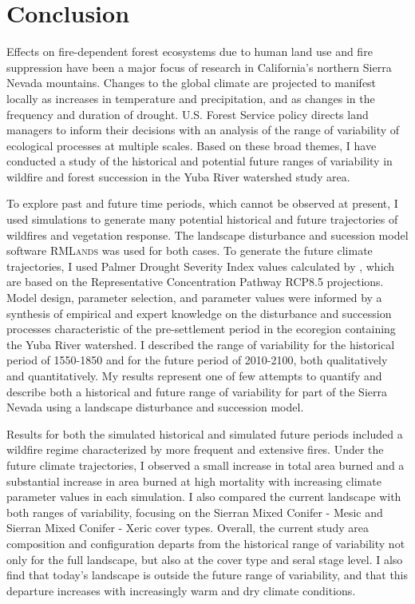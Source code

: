 
\chapter{Conclusion}

Effects on fire-dependent forest ecosystems due to human land use and fire suppression have been a major focus of research in California's northern Sierra Nevada mountains. Changes to the global climate are projected to manifest locally as increases in temperature and precipitation, and as changes in the frequency and duration of drought. U.S. Forest Service policy directs land managers to inform their decisions with an analysis of the range of variability of ecological processes at multiple scales. Based on these broad themes, I have conducted a study of the historical and potential future ranges of variability in wildfire and forest succession in the Yuba River watershed study area.

To explore past and future time periods, which cannot be observed at present, I used simulations to generate many potential historical and future trajectories of wildfires and vegetation response. The landscape disturbance and sucession model software \textsc{RMLands} was used for both cases. To generate the future climate trajectories, I used Palmer Drought Severity Index values calculated by \citet{Cook2014}, which are based on the Representative Concentration Pathway RCP8.5 projections. Model design, parameter selection, and parameter values were informed by a synthesis of empirical and expert knowledge on the disturbance and succession processes characteristic of the pre-settlement period in the ecoregion containing the Yuba River watershed. I described the range of variability for the historical period of 1550-1850 and for the future period of 2010-2100, both qualitatively and quantitatively. My results represent one of few attempts to quantify and describe both a historical and future range of variability for part of the Sierra Nevada using a landscape disturbance and succession model.

Results for both the simulated historical and simulated future periods included a wildfire regime characterized by more frequent and extensive fires. Under the future climate trajectories, I observed a small increase in total area burned and a substantial increase in area burned at high mortality with increasing climate parameter values in each simulation. I also compared the current landscape with both ranges of variability, focusing on the Sierran Mixed Conifer - Mesic and Sierran Mixed Conifer - Xeric cover types. Overall, the current study area composition and configuration departs from the historical range of variability not only for the full landscape, but also at the cover type and seral stage level. I also find that today's landscape is outside the future range of variability, and that this departure increases with increasingly warm and dry climate conditions.

